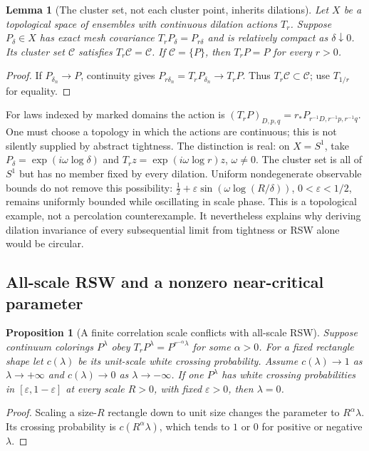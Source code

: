 \documentclass[11pt]{article}
\newtheorem{proposition}[theorem]{Proposition}
\newtheorem{lemma}[theorem]{Lemma}
\theoremstyle{definition}\newtheorem{definition}[theorem]{Definition}
\theoremstyle{remark}\newtheorem{remark}[theorem]{Remark}
\begin{document}
\begin{lemma}[The cluster set, not each cluster point, inherits dilations]
\label{lem:am-clusters}
Let $X$ be a topological space of ensembles with continuous dilation
actions $T_r$. Suppose $P_\delta\in X$ has exact mesh covariance
$T_rP_\delta=P_{r\delta}$ and is relatively compact as $\delta\downarrow0$.
Its cluster set $\mathcal C$ satisfies $T_r\mathcal C=\mathcal C$.
If $\mathcal C=\{P\}$, then $T_rP=P$ for every $r>0$.
\end{lemma}
\begin{proof}
If $P_{\delta_n}\to P$, continuity gives
$P_{r\delta_n}=T_rP_{\delta_n}\to T_rP$.
Thus $T_r\mathcal C\subset\mathcal C$; use $T_{1/r}$ for equality.
\end{proof}
For laws indexed by marked domains the action is
$(T_rP)_{D,p,q}=r_*P_{r^{-1}D,r^{-1}p,r^{-1}q}$.
One must choose a topology in which the actions are continuous; this is
not silently supplied by abstract tightness. The distinction is real:
on $X=S^1$, take $P_\delta=\exp(i\omega\log\delta)$ and
$T_rz=\exp(i\omega\log r)z$, $\omega\ne0$.
The cluster set is all of $S^1$ but has no member fixed by every dilation.
Uniform nondegenerate observable bounds do not remove this possibility:
$\tfrac12+\varepsilon\sin(\omega\log(R/\delta))$, $0<\varepsilon<1/2$,
remains uniformly bounded while oscillating in scale phase.
This is a topological example, not a percolation counterexample.
It nevertheless explains why deriving dilation invariance of every
subsequential limit from tightness or RSW alone would be circular.

\subsection{All-scale RSW and a nonzero near-critical parameter}

\begin{proposition}[A finite correlation scale conflicts with all-scale RSW]
\label{prop:am-rswmass}
Suppose continuum colorings $P^\lambda$ obey
$T_rP^\lambda=P^{r^{-\alpha}\lambda}$ for some $\alpha>0$.
For a fixed rectangle shape let $c(\lambda)$ be its unit-scale white
crossing probability. Assume $c(\lambda)\to1$ as $\lambda\to+\infty$ and
$c(\lambda)\to0$ as $\lambda\to-\infty$.
If one $P^\lambda$ has white crossing probabilities in
$[\varepsilon,1-\varepsilon]$ at every scale $R>0$, with fixed
$\varepsilon>0$, then $\lambda=0$.
\end{proposition}
\begin{proof}
Scaling a size-$R$ rectangle down to unit size changes the parameter to
$R^\alpha\lambda$. Its crossing probability is $c(R^\alpha\lambda)$,
which tends to $1$ or $0$ for positive or negative $\lambda$.
\end{proof}
\end{document}
